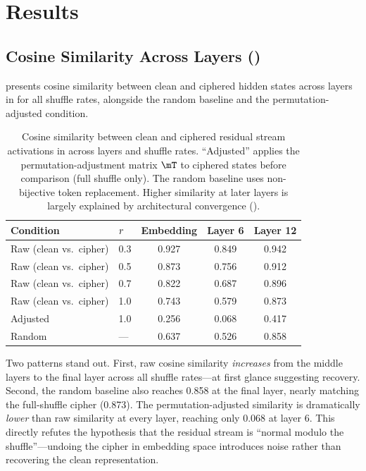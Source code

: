 \section{Results}
\label{sec:results}

\subsection{Cosine Similarity Across Layers (\gpttwo)}
\label{sec:cosine}

 presents cosine similarity between clean and ciphered hidden states across layers in \gpttwo for all shuffle rates, alongside the random baseline and the permutation-adjusted condition.

\begin{table}[t]
    \centering
    \caption{Cosine similarity between clean and ciphered residual stream activations in \gpttwo across layers and shuffle rates. ``Adjusted'' applies the permutation-adjustment matrix $\permmat$ to ciphered states before comparison (full shuffle only). The random baseline uses non-bijective token replacement. Higher similarity at later layers is largely explained by architectural convergence (\cf {}).}
    \label{tab:cosine_gpt2}
    \begin{tabular}{@{}llccc@{}}
        \toprule
        Condition & $r$ & Embedding & Layer 6 & Layer 12 \\
        \midrule
        Raw (clean vs.\ cipher) & 0.3 & 0.927 & 0.849 & 0.942 \\
        Raw (clean vs.\ cipher) & 0.5 & 0.873 & 0.756 & 0.912 \\
        Raw (clean vs.\ cipher) & 0.7 & 0.822 & 0.687 & 0.896 \\
        Raw (clean vs.\ cipher) & 1.0 & 0.743 & 0.579 & 0.873 \\
        \midrule
        Adjusted & 1.0 & 0.256 & 0.068 & 0.417 \\
        \midrule
        Random & --- & 0.637 & 0.526 & 0.858 \\
        \bottomrule
    \end{tabular}
\end{table}

Two patterns stand out. First, raw cosine similarity \emph{increases} from the middle layers to the final layer across all shuffle rates---at first glance suggesting recovery. Second, the random baseline also reaches 0.858 at the final layer, nearly matching the full-shuffle cipher (0.873). The permutation-adjusted similarity is dramatically \emph{lower} than raw similarity at every layer, reaching only 0.068 at layer 6. This directly refutes the hypothesis that the residual stream is ``normal modulo the shuffle''---undoing the cipher in embedding space introduces noise rather than recovering the clean representation.

